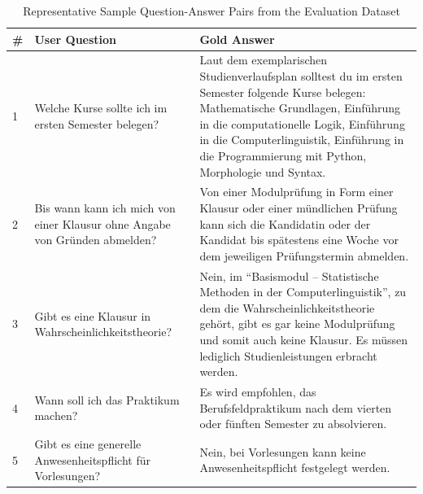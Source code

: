 \documentclass[12pt]{article} %
\begin{document}
\begin{table}[htbp]
    \centering
    \small
    \caption{Representative Sample Question-Answer Pairs from the Evaluation Dataset}
    \label{tab:dataset_samples}
    \renewcommand{\arraystretch}{1.3}
    \begin{tabular}{p{} p{} p{}}
        \toprule
        \textbf{\#} & \textbf{User Question}                                                     & \textbf{Gold Answer}                                                                                                                                                                                                                                                             \\
        \midrule
        1           & Welche Kurse sollte ich im ersten Semester belegen?                        & Laut dem exemplarischen Studienverlaufsplan solltest du im ersten Semester folgende Kurse belegen: Mathematische Grundlagen, Einführung in die computationelle Logik, Einführung in die Computerlinguistik, Einführung in die Programmierung mit Python, Morphologie und Syntax. \\
        \midrule
        2           & Bis wann kann ich mich von einer Klausur ohne Angabe von Gründen abmelden? & Von einer Modulprüfung in Form einer Klausur oder einer mündlichen Prüfung kann sich die Kandidatin oder der Kandidat bis spätestens eine Woche vor dem jeweiligen Prüfungstermin abmelden.                                                                                      \\
        \midrule
        3           & Gibt es eine Klausur in Wahrscheinlichkeitstheorie?                        & Nein, im ``Basismodul -- Statistische Methoden in der Computerlinguistik'', zu dem die Wahrscheinlichkeitstheorie gehört, gibt es gar keine Modulprüfung und somit auch keine Klausur. Es müssen lediglich Studienleistungen erbracht werden.                                    \\
        \midrule
        4           & Wann soll ich das Praktikum machen?                                        & Es wird empfohlen, das Berufsfeldpraktikum nach dem vierten oder fünften Semester zu absolvieren.                                                                                                                                                                                \\
        \midrule
        5           & Gibt es eine generelle Anwesenheitspflicht für Vorlesungen?                & Nein, bei Vorlesungen kann keine Anwesenheitspflicht festgelegt werden.                                                                                                                                                                                                          \\
        \bottomrule
    \end{tabular}
\end{table}
\end{document}

